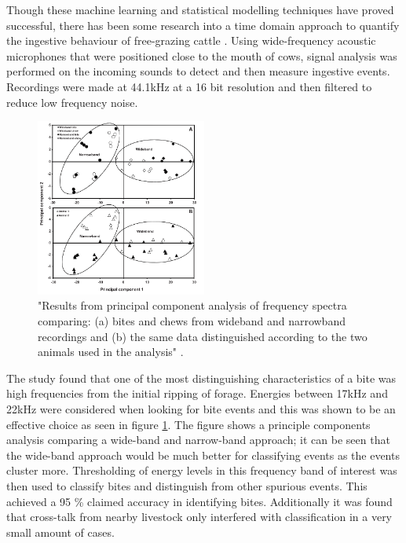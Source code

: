 Though these machine learning and statistical modelling techniques have proved successful, there has been some research into a time domain approach to quantify the ingestive behaviour of free-grazing cattle \cite{Clapham2011}. Using wide-frequency acoustic microphones that were positioned close to the mouth of cows, signal analysis was performed on the incoming sounds to detect and then measure ingestive events. Recordings were made at 44.1kHz at a 16 bit resolution and then filtered to reduce low frequency noise.  \\

\begin{figure}[ht!]
\begin{center}
\leavevmode
\includegraphics[width=0.5\textwidth]{images/clapham.png}
\end{center}
\caption[PCA of bite/chew frequency spectra]{"Results from principal component analysis of frequency spectra comparing: (a) bites and chews from wideband and narrowband recordings and (b) the same data distinguished according to the two animals used in the analysis" \cite{Clapham2011}. }
\label{clapham}
\end{figure}

The study found that one of the most distinguishing characteristics of a bite was high frequencies from the initial ripping of forage. Energies between 17kHz and 22kHz were considered when looking for bite events and this was shown to be an effective choice as seen in figure \ref{clapham}. The figure shows a principle components analysis comparing a wide-band and narrow-band approach; it can be seen that the wide-band approach would be much better for classifying events as the events cluster more. Thresholding of energy levels in this frequency band of interest was then used to classify bites and distinguish from other spurious events. This achieved a 95 \% claimed accuracy in identifying bites. Additionally it was found that cross-talk from nearby livestock only interfered with classification in a very small amount of cases. 

